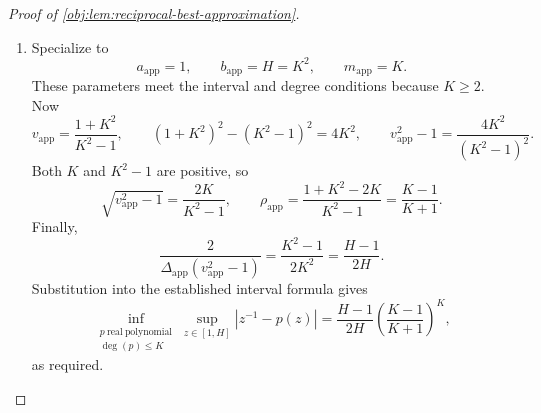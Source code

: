 \begin{proof}[Proof of \cref{obj:lem:reciprocal-best-approximation}]
\begin{enumerate}
\[\begin{aligned}
E_{\mathrm{app}}
&\le
\sum_{\iota=0}^{m_{\mathrm{app}}+1}
|w_{\mathrm{app},\iota}|
\left|z_{\mathrm{app},\iota}^{-1}
-q_{\mathrm{app}}(z_{\mathrm{app},\iota})\right|\\
&\le
\sup_{z\in[a_{\mathrm{app}},b_{\mathrm{app}}]}
|z^{-1}-q_{\mathrm{app}}(z)|.
\end{aligned}
\]
The residuals are continuous on this compact positive interval, so these suprema are finite. The lower bound for every admissible polynomial and the upper bound attained by \(p_{\mathrm{app}}\) establish
\[
\inf_{\substack{q_{\mathrm{app}}\ \mathrm{real\ polynomial}\\
\deg(q_{\mathrm{app}})\le m_{\mathrm{app}}}}
\sup_{z\in[a_{\mathrm{app}},b_{\mathrm{app}}]}
|z^{-1}-q_{\mathrm{app}}(z)|
=
\frac{2\rho_{\mathrm{app}}^{m_{\mathrm{app}}}}
{\Delta_{\mathrm{app}}(v_{\mathrm{app}}^2-1)}.
\]

\item Specialize to
\[
a_{\mathrm{app}}=1,\qquad b_{\mathrm{app}}=H=K^2,
\qquad m_{\mathrm{app}}=K.
\]
These parameters meet the interval and degree conditions because \(K\ge2\).
Now
\[
v_{\mathrm{app}}=\frac{1+K^2}{K^2-1},
\qquad
(1+K^2)^2-(K^2-1)^2=4K^2,
\qquad
v_{\mathrm{app}}^2-1=\frac{4K^2}{(K^2-1)^2}.
\]
Both \(K\) and \(K^2-1\) are positive, so
\[
\sqrt{v_{\mathrm{app}}^2-1}
=\frac{2K}{K^2-1},
\qquad
\rho_{\mathrm{app}}
=
\frac{1+K^2-2K}{K^2-1}
=
\frac{K-1}{K+1}.
\]
Finally,
\[
\frac{2}{\Delta_{\mathrm{app}}(v_{\mathrm{app}}^2-1)}
=
\frac{K^2-1}{2K^2}
=
\frac{H-1}{2H}.
\]
Substitution into the established interval formula gives
\[
\inf_{\substack{p\ \mathrm{real\ polynomial}\\ \deg(p)\le K}}
\sup_{z\in[1,H]}|z^{-1}-p(z)|
=
\frac{H-1}{2H}
\left(\frac{K-1}{K+1}\right)^K,
\]
as required.
\end{enumerate}
\end{proof}
